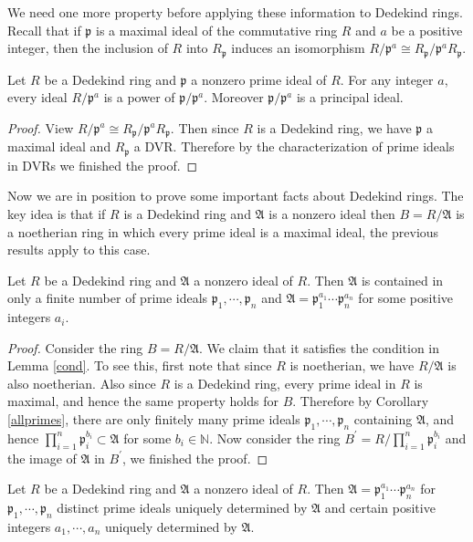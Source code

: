 We need one more property before applying these information to Dedekind rings. Recall that if $\mathfrak{p}$ is a maximal ideal of the commutative ring $R$ and $a$ be a positive integer, then the inclusion of $R$ into $R_\mathfrak{p}$ induces an isomorphism $R/\mathfrak{p}^a\cong R_\mathfrak{p}/\mathfrak{p}^aR_\mathfrak{p}$.
\begin{corollary}
Let $R$ be a Dedekind ring and $\mathfrak{p}$ a nonzero prime ideal of $R$. For any integer $a$, every ideal $R/\mathfrak{p}^a$ is a power of $\mathfrak{p}/\mathfrak{p}^a$. Moreover $\mathfrak{p}/\mathfrak{p}^a$ is a principal ideal.
\end{corollary}
\begin{proof}
View $R/\mathfrak{p}^a\cong R_\mathfrak{p}/\mathfrak{p}^aR_\mathfrak{p}$. Then since $R$ is a Dedekind ring, we have $\mathfrak{p}$ a maximal ideal and $R_\mathfrak{p}$ a DVR. Therefore by the characterization of prime ideals in DVRs we finished the proof.
\end{proof}
Now we are in position to prove some important facts about Dedekind rings. The key idea is that if $R$ is a Dedekind ring and $\mathfrak{A}$ is a nonzero ideal then $B=R/\mathfrak{A}$ is a noetherian ring in which every prime ideal is a maximal ideal, the previous results apply to this case.
\begin{theorem}\label{exis}
Let $R$ be a Dedekind ring and $\mathfrak{A}$ a nonzero ideal of $R$. Then $\mathfrak{A}$ is contained in only a finite number of prime ideals $\mathfrak{p}_1,\cdots,\mathfrak{p}_n$ and $\mathfrak{A}=\mathfrak{p}_1^{a_1}\cdots\mathfrak{p}_n^{a_n}$ for some positive integers $a_i$.
\end{theorem}
\begin{proof}
Consider the ring $B=R/\mathfrak{A}$. We claim that it satisfies the condition in Lemma \ref{cond}. To see this, first note that since $R$ is noetherian, we have $R/\mathfrak{A}$ is also noetherian. Also since $R$ is a Dedekind ring, every prime ideal in $R$ is maximal, and hence the same property holds for $B$. Therefore by Corollary \ref{allprimes}, there are only finitely many prime ideals $\mathfrak{p}_1,\cdots,\mathfrak{p}_n$ containing $\mathfrak{A}$, and hence $\prod_{i=1}^n\mathfrak{p}_i^{b_i}\subset\mathfrak{A}$ for some $b_i\in\mathbb{N}$. Now consider the ring $B^\prime=R/\prod_{i=1}^n\mathfrak{p}_i^{b_i}$ and the image of $\mathfrak{A}$ in $B^\prime$, we finished the proof.
\end{proof}
\begin{theorem}\label{FacIdeal}
Let $R$ be a Dedekind ring and $\mathfrak{A}$ a nonzero ideal of $R$. Then $\mathfrak{A}=\mathfrak{p}_1^{a_1}\cdots\mathfrak{p}_n^{a_n}$ for $\mathfrak{p}_1,\cdots,\mathfrak{p}_n$ distinct prime ideals uniquely determined by $\mathfrak{A}$ and certain positive integers $a_1,\cdots,a_n$ uniquely determined by $\mathfrak{A}$.
\end{theorem}
